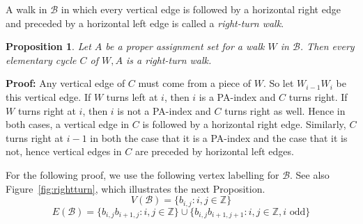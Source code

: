 \documentclass{llncs}
\newcommand{\PF}{{\bf Proof: }}
\newcommand{\QED}{\hspace*{\fill}{$\Box$}\medskip}
\def\term#1{{\em #1}\marginpar{\raggedright{\small\it #1}}}
\newcommand{\BW}{\mathcal{B}}
\newtheorem{propo}[thm]{Proposition}
\begin{document}
\medskip

A walk in $\BW$ in which every vertical edge is followed by a horizontal right edge and preceded by a horizontal left edge is called a \term{right-turn walk}.


\begin{propo}
\label{propo:elcyc_rightturn}
Let $A$ be a proper assignment set for a walk $W$ in $\BW$. Then every elementary cycle $C$ of $W,A$ is a right-turn walk.
\end{propo}
\PF
Any vertical edge of $C$ must come from a piece of $W$. So let $W_{i-1}W_{i}$ be this vertical edge. If $W$ turns left at $i$, then $i$ is a PA-index and $C$ turns right. If $W$ turns right at $i$, then $i$ is not a PA-index and $C$ turns right as well. Hence in both cases, a vertical edge in $C$ is followed by a horizontal right edge.
Similarly, $C$ turns right at $i-1$ in both the case that it is a PA-index and the case that it is not, hence vertical edges in $C$ are preceded by horizontal left edges.
\QED

For the following proof, 
we use the following vertex labelling for $\BW$. See also Figure~\ref{fig:rightturn}, which illustrates the next Proposition.
\[
V(\BW)=\{b_{i,j}:i,j\in \mathbb{Z}\}
\]
\[
E(\BW)=	\{b_{i,j}b_{i+1,j}:i,j\in \mathbb{Z}\} \cup 
	\{b_{i,j}b_{i+1,j+1}:i,j\in \mathbb{Z}, i\mbox{ odd}\}
\]
\end{document}
